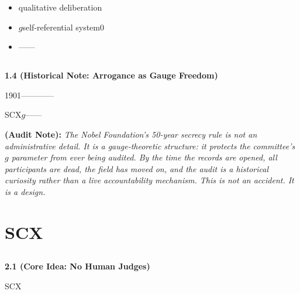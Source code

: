 \documentclass[12pt,a4paper]{article}
\theoremstyle{remark}
\newenvironment{honestbox}{%
    \medskip\noindent
    \color{red}
    \begin{minipage}{0.92\textwidth}
    \textbf{}
    \begin{itemize}[leftmargin=*]
}{%
    \end{itemize}
    \end{minipage}
    \medskip
}
\newcommand{\auditnote}[1]{%
    \medskip\noindent
    \textbf{ (Audit Note):} \textit{#1}%
}
\begin{document}
\begin{honestbox}
    \item \textbf{}qualitative deliberation
    \item $g$self-referential system0
    \item ——\textit{}
\end{honestbox}

\subsection{}

\noindent
\textbf{1.4  (Historical Note: Arrogance as Gauge Freedom)}

1901————

SCX\textbf{}$g$——

\auditnote{The Nobel Foundation's 50-year secrecy rule is not an administrative detail. It is a gauge-theoretic structure: it protects the committee's $g$ parameter from ever being audited. By the time the records are opened, all participants are dead, the field has moved on, and the audit is a historical curiosity rather than a live accountability mechanism. This is not an accident. It is a design.}

\newpage

\section{SCX}
\label{sec:mechanism}

\subsection{}

\noindent
\textbf{2.1  (Core Idea: No Human Judges)}

SCX

\begin{center}
\end{center}
\end{document}
